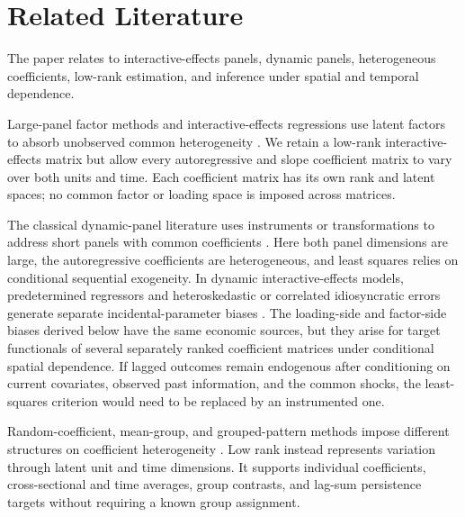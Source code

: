 \documentclass[11pt]{article}
\numberwithin{equation}{section}
\theoremstyle{remark}
\begin{document}
\section{Related Literature}
\label{sec:literature}

The paper relates to interactive-effects panels, dynamic panels, heterogeneous coefficients, low-rank estimation, and inference under spatial and temporal dependence.

Large-panel factor methods and interactive-effects regressions use latent factors to absorb unobserved common heterogeneity \citep{bai2002,bai2003,pesaran2006,moonweidner2015}. We retain a low-rank interactive-effects matrix but allow every autoregressive and slope coefficient matrix to vary over both units and time. Each coefficient matrix has its own rank and latent spaces; no common factor or loading space is imposed across matrices.

The classical dynamic-panel literature uses instruments or transformations to address short panels with common coefficients \citep{andersonhsiao1981,andersonhsiao1982,arellanobond1991}. Here both panel dimensions are large, the autoregressive coefficients are heterogeneous, and least squares relies on conditional sequential exogeneity. In dynamic interactive-effects models, predetermined regressors and heteroskedastic or correlated idiosyncratic errors generate separate incidental-parameter biases \citep{moonweidner2017}. The loading-side and factor-side biases derived below have the same economic sources, but they arise for target functionals of several separately ranked coefficient matrices under conditional spatial dependence. If lagged outcomes remain endogenous after conditioning on current covariates, observed past information, and the common shocks, the least-squares criterion would need to be replaced by an instrumented one.

Random-coefficient, mean-group, and grouped-pattern methods impose different structures on coefficient heterogeneity \citep{swamy1970,pesaransmith1995,bonhommemanresa2015}. Low rank instead represents variation through latent unit and time dimensions. It supports individual coefficients, cross-sectional and time averages, group contrasts, and lag-sum persistence targets without requiring a known group assignment.
\end{document}
